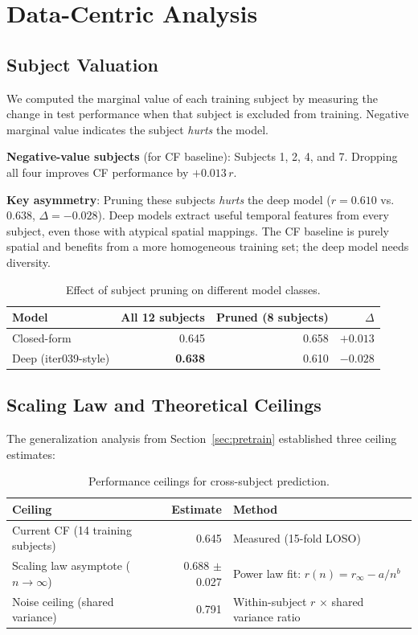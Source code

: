 \documentclass[11pt,a4paper]{article}
\begin{document}
\section{Data-Centric Analysis}
\label{sec:datacentric}

\subsection{Subject Valuation}

We computed the marginal value of each training subject by measuring the
change in test performance when that subject is excluded from training.
Negative marginal value indicates the subject \emph{hurts} the model.

\textbf{Negative-value subjects} (for CF baseline): Subjects 1, 2, 4,
and 7. Dropping all four improves CF performance by $+0.013\,r$.

\textbf{Key asymmetry}: Pruning these subjects \emph{hurts} the deep
model ($r = 0.610$ vs.\ $0.638$, $\Delta = -0.028$). Deep models extract
useful temporal features from every subject, even those with atypical
spatial mappings. The CF baseline is purely spatial and benefits from a
more homogeneous training set; the deep model needs diversity.

\begin{table}[H]
\centering
\caption{Effect of subject pruning on different model classes.}
\begin{tabular}{lrrr}
\toprule
Model & All 12 subjects & Pruned (8 subjects) & $\Delta$ \\
\midrule
Closed-form & 0.645 & 0.658 & \textcolor{good}{$+0.013$} \\
Deep (iter039-style) & \textbf{0.638} & 0.610 & \textcolor{bad}{$-0.028$} \\
\bottomrule
\end{tabular}
\end{table}

\subsection{Scaling Law and Theoretical Ceilings}

The generalization analysis from Section~\ref{sec:pretrain} established
three ceiling estimates:

\begin{table}[H]
\centering
\caption{Performance ceilings for cross-subject prediction.}
\begin{tabular}{lrl}
\toprule
Ceiling & Estimate & Method \\
\midrule
Current CF (14 training subjects) & 0.645 & Measured (15-fold LOSO) \\
Scaling law asymptote ($n \to \infty$) & 0.688 $\pm$ 0.027 & Power law fit: $r(n) = r_\infty - a/n^b$ \\
Noise ceiling (shared variance) & 0.791 & Within-subject $r$ $\times$ shared variance ratio \\
\bottomrule
\end{tabular}
\end{table}
\end{document}
